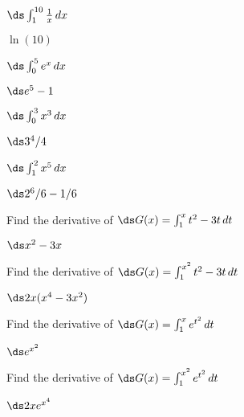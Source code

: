 \begin{theorem}
\begin{exercises}
\iflatetranscendentals
\else
\begin{exercise} $\ds \int_1^{10} {1\over x}\,dx$
\begin{answer} $\ln(10)$
\end{answer}\end{exercise}

\begin{exercise} $\ds \int_0^5 e^x\,dx$
\begin{answer} $\ds e^5-1$
\end{answer}\end{exercise}
\fi

\begin{exercise} $\ds \int_0^3 x^3\,dx$
\begin{answer} $\ds 3^4/4$
\end{answer}\end{exercise}

\begin{exercise} $\ds \int_1^2 x^5\,dx$
\begin{answer} $\ds 2^6/6 -1/6$
\end{answer}\end{exercise}

\endtwocol

\msk
\begin{exercise} Find the derivative of $\ds G(x)=\int_1^x t^2-3t\,dt$
\begin{answer} $\ds x^2-3x$
\end{answer}\end{exercise}

\begin{exercise} Find the derivative of $\ds G(x)=\int_1^{x^2} t^2-3t\,dt$
\begin{answer} $\ds 2x(x^4-3x^2)$
\end{answer}\end{exercise}

\iflatetranscendentals
\else
\begin{exercise} Find the derivative of $\ds G(x)=\int_1^x e^{t^2}\,dt$
\begin{answer} $\ds e^{x^2}$
\end{answer}\end{exercise}

\begin{exercise} Find the derivative of $\ds G(x)=\int_1^{x^2} e^{t^2}\,dt$
\begin{answer} $\ds 2xe^{x^4}$
\end{answer}\end{exercise}
\fi


\end{exercises}
\end{theorem}
